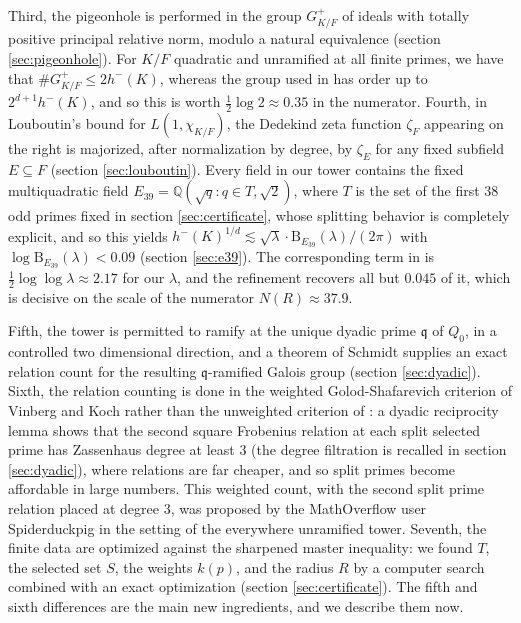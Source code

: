 Third, the pigeonhole is performed in the group $G_{K/F}^{+}$ of ideals
with totally positive principal relative norm, modulo a natural
equivalence (section \ref{sec:pigeonhole}). For $K/F$ quadratic and
unramified at all finite primes, we have that
$\#G_{K/F}^{+}\leq2h^{-}(K)$, whereas the group used in
\cite[Lemma 6]{Sawin} has order up to $2^{d+1}h^{-}(K)$, and so this is
worth $\frac{1}{2}\log2\approx0.35$ in the numerator. Fourth, in
Louboutin's bound for $L(1,\chi_{K/F})$, the Dedekind zeta function
$\zeta_{F}$ appearing on the right is majorized, after normalization by
degree, by $\zeta_{E}$ for any fixed subfield $E\subseteq F$ (section
\ref{sec:louboutin}). Every field in our tower contains the fixed
multiquadratic field $E_{39}=\mathbb{Q}(\sqrt{q}:q\in T,\sqrt{2})$,
where $T$ is the set of the first $38$ odd primes fixed in section
\ref{sec:certificate}, whose splitting behavior is completely explicit,
and so this yields
$h^{-}(K)^{1/d}\lesssim\sqrt{\lambda}\cdot\mathrm{B}_{E_{39}}(\lambda)/(2\pi)$
with $\log\mathrm{B}_{E_{39}}(\lambda)<0.09$ (section \ref{sec:e39}).
The corresponding term in \cite[Lemma 9]{Sawin} is
$\frac{1}{2}\log\log\lambda\approx2.17$ for our $\lambda$, and the
refinement recovers all but $0.045$ of it, which is decisive on the
scale of the numerator $N(R)\approx37.9$.

Fifth, the tower is permitted
to ramify at the unique dyadic prime $\mathfrak{q}$ of $Q_{0}$, in a
controlled two dimensional direction, and a theorem of Schmidt
\cite{Schmidt} supplies an exact relation count for the resulting
$\mathfrak{q}$-ramified Galois group (section \ref{sec:dyadic}). Sixth,
the relation counting is done in the weighted Golod-Shafarevich
criterion of Vinberg and Koch \cite{Vinberg,Koch} rather than the
unweighted criterion of \cite[Lemma 11]{Sawin}: a dyadic reciprocity
lemma shows that the second square Frobenius relation at each split
selected prime has Zassenhaus degree at least $3$ (the degree filtration is recalled in section \ref{sec:dyadic}), where relations are far cheaper, and so split primes become affordable in large numbers.
This weighted count, with the second split prime relation placed at
degree $3$, was proposed by the MathOverflow user Spiderduckpig
\cite{Spiderduckpig} in the setting of the everywhere unramified tower.
Seventh, the finite data are optimized against the sharpened master
inequality: we found $T$, the selected set $S$, the weights $k(p)$, and
the radius $R$ by a computer search combined with an exact optimization
(section \ref{sec:certificate}). The fifth and sixth differences are
the main new ingredients, and we describe them now.

